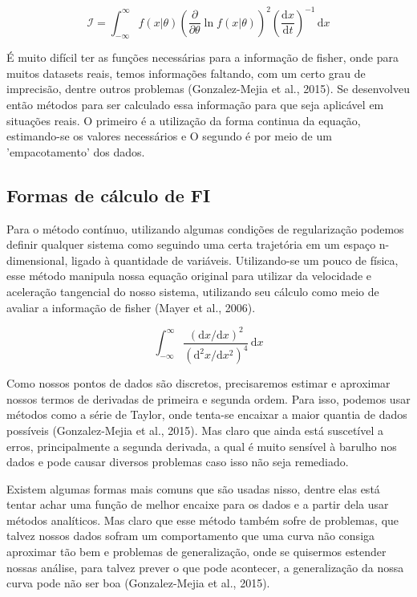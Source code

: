 \documentclass{article}[12pt]
\begin{document}
\begin{equation}
    \mathcal{I}  = \int_{-\infty}^{\infty} f(x|\theta ) (\frac{\partial }{\partial \theta } \ln f(x|\theta ))^{2}(\frac{\mathrm{d}x}{\mathrm{d}t})^{-1}   \,\mathrm{d}x
\end{equation}

É muito difícil ter as funções necessárias para a informação de fisher, onde para muitos datasets
reais, temos informações faltando, com um certo grau de imprecisão, dentre outros problemas (Gonzalez-Mejia et al., 2015). Se
desenvolveu então métodos para ser calculado essa informação para que seja aplicável em situações
reais. O primeiro é a utilização da forma continua da equação, estimando-se os valores necessários e
O segundo é por meio de um 'empacotamento' dos dados.


\subsection{Formas de cálculo de FI}

Para o método contínuo, utilizando algumas condições de regularização podemos definir qualquer
sistema como seguindo uma certa trajetória em um espaço n-dimensional, ligado à quantidade de
variáveis. Utilizando-se um pouco de física, esse método manipula nossa equação original para
utilizar da velocidade e aceleração tangencial do nosso sistema, utilizando seu cálculo como meio de
avaliar a informação de fisher (Mayer et al., 2006). \par

\begin{equation}\label{eq: forma vel acel}
    \int_{-\infty}^{\infty} \frac{(\mathrm{d}x/ \mathrm{d} x)^{2} }{(\mathrm{d}^{2} x/\mathrm{d}x^{2})^4 } \,\mathrm{d}x 
\end{equation}

Como nossos pontos de dados são discretos, precisaremos estimar e aproximar nossos termos de
derivadas de primeira e segunda ordem. Para isso, podemos usar métodos como a série de Taylor, onde
tenta-se encaixar a maior quantia de dados possíveis (Gonzalez-Mejia et al., 2015). Mas claro que ainda está suscetível a erros,
principalmente a segunda derivada, a qual é muito sensível à barulho nos dados e pode causar
diversos problemas caso isso não seja remediado.\par

Existem algumas formas mais comuns que são usadas nisso, dentre elas está tentar achar uma função de
melhor encaixe para os dados e a partir dela usar métodos analíticos. Mas claro que esse método
também sofre de problemas, que talvez nossos dados sofram um comportamento que uma curva não consiga
aproximar tão bem e problemas de generalização, onde se quisermos estender nossas análise, para
talvez prever o que pode acontecer, a generalização da nossa curva pode não ser boa (Gonzalez-Mejia et al., 2015). \par
\end{document}

